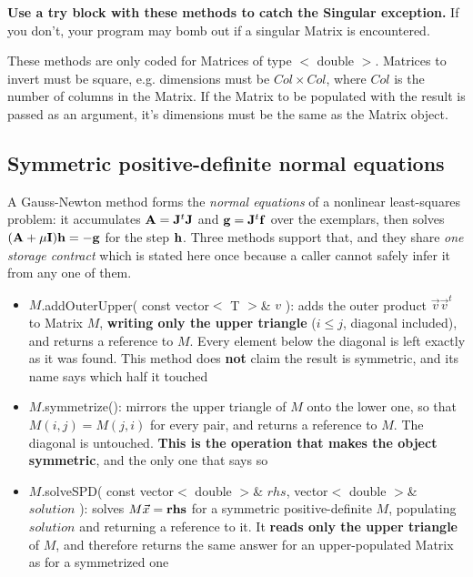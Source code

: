 \documentclass{report}
\begin{document}
{\bf Use a try block with these methods to catch the Singular
exception.}  If you don't, your program may bomb out if a singular
Matrix is encountered.

These methods are only coded for Matrices of type $<$ double $>$.
Matrices to invert must be square, e.g. dimensions must be $Col \times
Col$, where $Col$ is the number of columns in the Matrix. If the
Matrix to be populated with the result is passed as an argument, it's
dimensions must be the same as the Matrix object.

\subsection{Symmetric positive-definite normal equations}

A Gauss-Newton method forms the {\em normal equations} of a nonlinear
least-squares problem: it accumulates ${\bf A} = {\bf J}^t{\bf J}$ and
${\bf g} = {\bf J}^t{\bf f}$ over the exemplars, then solves
$({\bf A} + \mu{\bf I}){\bf h} = -{\bf g}$ for the step ${\bf h}$.  Three
methods support that, and they share {\em one storage contract} which is stated
here once because a caller cannot safely infer it from any one of them.

\begin{itemize}
\item $M$.addOuterUpper( const vector$<$ T $>$\& $v$ ): adds the outer product
      $\vec{v}\vec{v}^t$ to Matrix $M$, {\bf writing only the upper triangle}
      ($i \le j$, diagonal included), and returns a reference to $M$.  Every
      element below the diagonal is left exactly as it was found.  This method
      does {\bf not} claim the result is symmetric, and its name says which half
      it touched
\item $M$.symmetrize(): mirrors the upper triangle of $M$ onto the lower one, so
      that $M(i,j) = M(j,i)$ for every pair, and returns a reference to $M$.
      The diagonal is untouched.  {\bf This is the operation that makes the
      object symmetric}, and the only one that says so
\item $M$.solveSPD( const vector$<$ double $>$\& $rhs$, vector$<$ double $>$\&
      $solution$ ): solves $M\vec{x} = {\bf rhs}$ for a symmetric
      positive-definite $M$, populating $solution$ and returning a reference to
      it.  It {\bf reads only the upper triangle} of $M$, and therefore returns
      the same answer for an upper-populated Matrix as for a symmetrized one
\end{itemize}
\end{document}
